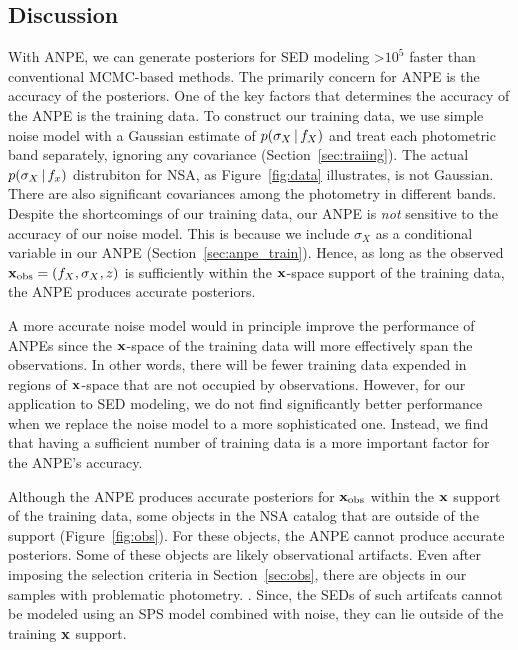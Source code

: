 \subsection{Discussion} \label{sec:discuss}
With ANPE, we can generate posteriors for SED modeling >$10^5$ faster than
conventional MCMC-based methods. 
The primarily concern for ANPE is the accuracy of the posteriors.
One of the key factors that determines the accuracy of the ANPE is the training
data.  
To construct our training data, we use simple noise model with a Gaussian
estimate of $p(\sigma_X\,|\, f_X)$ and treat each photometric band separately,
ignoring any covariance (Section~\ref{sec:traiing}). 
The actual $p(\sigma_X\,|\, f_x)$ distrubiton for NSA, as
Figure~\ref{fig:data} illustrates, is not Gaussian. 
There are also significant covariances among the photometry in different bands.
Despite the shortcomings of our training data, our ANPE is \emph{not}
sensitive to the accuracy of our noise model. 
This is because we include $\sigma_X$ as a conditional variable in our ANPE 
(Section~\ref{sec:anpe_train}).
Hence, as long as the observed ${\bf x}_{\rm obs} = (f_X, \sigma_X, z)$ is
sufficiently within the ${\bf x}$-space support of the training data, the ANPE
produces accurate posteriors. 

A more accurate noise model would in principle improve the performance of ANPEs
since the ${\bf x}$-space of the training data will more effectively span the
observations. 
In other words, there will be fewer training data expended in regions of 
${\bf x}$-space that are not occupied by observations.  
However, for our application to SED modeling, we do not find significantly  
better performance when we replace the noise model to a more sophisticated one.
Instead, we find that having a sufficient number of training data is a more
important factor for the ANPE's accuracy. 

Although the ANPE produces accurate posteriors for ${\bf x}_{\rm obs}$ within
the ${\bf x}$ support of the training data, some objects in the NSA catalog
that are outside of the support (Figure~\ref{fig:obs}). 
For these objects, the ANPE cannot produce accurate posteriors. 
Some of these objects are likely observational artifacts. 
Even after imposing the selection criteria in Section~\ref{sec:obs}, there
are objects in our samples with problematic photometry.  
. 
Since, the SEDs of such artifcats cannot be modeled using an SPS model combined
with noise, they can lie outside of the training ${\bf x}$ support.

